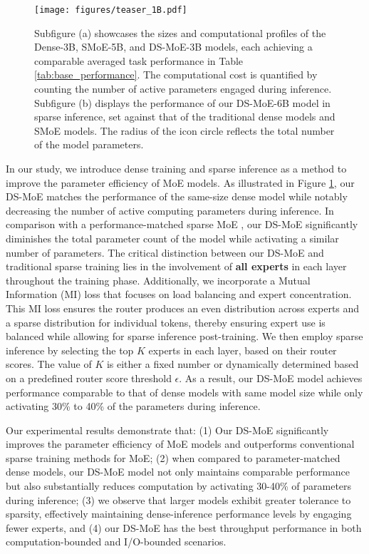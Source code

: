 \begin{figure}[h]
\centering
\texttt{[image: figures/teaser\_1B.pdf]}
\caption{Subfigure (a) showcases the sizes and computational profiles of the Dense-3B, SMoE-5B, and DS-MoE-3B models, each achieving a comparable averaged task performance in Table \ref{tab:base_performance}. The computational cost is quantified by counting the number of active parameters engaged during inference. Subfigure (b) displays the performance of our DS-MoE-6B model in sparse inference, set against that of the traditional dense models and SMoE models. The radius of the icon circle reflects the total number of the model parameters.}
\label{fig:teaser}
\end{figure}
In our study, we introduce dense training and sparse inference as a method to improve the parameter efficiency of MoE models. As illustrated in Figure \ref{fig:teaser}, our DS-MoE matches the performance of the same-size dense model while notably decreasing the number of active computing parameters during inference. In comparison with a performance-matched sparse MoE \cite{fedus2022switch, gale2023megablocks}, our DS-MoE significantly diminishes the total parameter count of the model while activating a similar number of parameters. The critical distinction between our DS-MoE and traditional sparse training lies in the involvement of \textbf{all experts} in each layer throughout the training phase. Additionally, we incorporate a Mutual Information (MI) loss \cite{shen2023moduleformer} that focuses on load balancing and expert concentration. This MI loss ensures the router produces an even distribution across experts and a sparse distribution for individual tokens, thereby ensuring expert use is balanced while allowing for sparse inference post-training. We then employ sparse inference by selecting the top \(K\) experts in each layer, based on their router scores. The value of \(K\) is either a fixed number or dynamically determined based on a predefined router score threshold \(\epsilon\). As a result, our DS-MoE model achieves performance comparable to that of dense models with same model size while only activating 30\% to 40\% of the parameters during inference.

Our experimental results demonstrate that: (1) Our DS-MoE significantly improves the parameter efficiency of MoE models and outperforms conventional sparse training methods for MoE; (2) when compared to  parameter-matched dense models, our DS-MoE model not only maintains comparable performance but also substantially reduces computation by activating 30-40\% of parameters during inference;  (3) we observe that larger models exhibit greater tolerance to sparsity, effectively maintaining dense-inference performance levels by engaging fewer experts, and (4) our DS-MoE has the best throughput performance in both computation-bounded and I/O-bounded scenarios.\vspace{-1mm}
